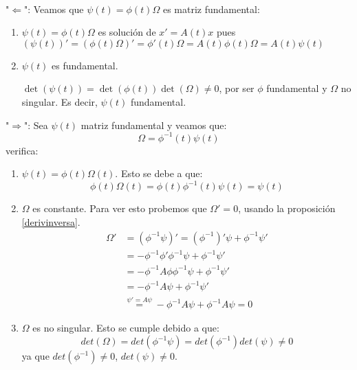 \documentclass{article}
\makeatletter
\theoremstyle{theorem-style}  %
\theoremstyle{definition-style}
\theoremstyle{example-style}
\renewenvironment{proof}[1][\proofname]{\par
	\pushQED{\qed}%
	\normalfont \topsep6\p@\@plus6\p@\relax
	\list{}{%
		\settowidth{\leftmargin}{\quad:\hskip\labelsep}%
		\setlength{\labelwidth}{0pt}%
		\setlength{\itemindent}{-\leftmargin}%
	}%
	\item[\hskip\labelsep\itshape#1\@addpunct{:}]\ignorespaces
}{%
	\popQED\endlist\@endpefalse
}
\makeatother
\begin{document}
\begin{proof}\ \\
	"$ \Leftarrow $": Veamos que $ \psi(t)=\phi(t)\varOmega $ es matriz fundamental:
	\begin{enumerate}[\quad i)]
		\item $ \psi(t)=\phi(t)\varOmega $ es solución de $ x'=A(t)x $ pues $ (\psi(t))'=(\phi(t)\varOmega)'=\phi'(t)\varOmega=A(t)\phi(t)\varOmega =A(t)\psi(t) $
		\item $ \psi(t) $ es fundamental.
		
		$ \det (\psi(t))=\det(\phi(t))\det(\varOmega)\neq 0 $, por ser $ \phi $ fundamental y $ \varOmega $ no singular. Es decir, $ \psi(t) $ fundamental.
	\end{enumerate}
	"$ \Rightarrow$": Sea $\psi (t)$ matriz fundamental y veamos que:
	\[\varOmega = \phi^{-1} (t) \psi(t)\]
	verifica:
	\begin{enumerate}
		\item  $\psi(t) = \phi(t) \varOmega(t)$. Esto se debe a que:
		\[\phi(t) \varOmega (t) = \phi(t) \phi^{-1}(t) \psi(t) = \psi(t) \]
		\item  $\varOmega$ es constante. Para ver esto probemos que $\varOmega' = 0$, usando la proposición \ref{derivinversa}.
		\begin{align*}
			\varOmega' &= (\phi^{-1} \psi)' = (\phi^{-1})'\psi + \phi^{-1}\psi' \\ 
			&= -\phi^{-1} \phi' \phi^{-1} \psi + \phi^{-1}\psi'\\
			&= -\phi^{-1} A \phi \phi^{-1} \psi + \phi^{-1} \psi'\\
			&= -\phi^{-1} A \psi + \phi^{-1} \psi' \\
			&\stackrel{\psi' = A \psi}{=} -\phi^{-1} A \psi + \phi^{-1} A \psi = 0
		\end{align*}
		\item  $\varOmega$ es no singular. Esto se cumple debido a que:
		\[det(\varOmega) = det(\phi^{-1} \psi) = det(\phi^{-1}) det(\psi) \neq 0\]
		ya que $det(\phi^{-1}) \neq 0$, $det(\psi) \neq 0$.
	\end{enumerate}
\end{proof}
\end{document}
